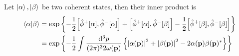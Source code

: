 \begin{lemma}\label{thm:coherent_state_inner_product}
	Let $\ket{\alpha},\ket{\beta}$ be two coherent states, then their inner product is
	\begin{equation}
		\begin{split}
			\braket{\alpha}{\beta}
			&=
			\exp\left\{
				-
				\frac{1}{2}
				\comm{\hat\phi^+[\alpha]}{\hat\phi^-[\alpha]}
				+
				\comm{\hat\phi^+[\alpha]}{\hat\phi^-[\beta]}
				-
				\frac{1}{2}
				\comm{\hat\phi^+[\beta]}{\hat\phi^-[\beta]}
			\right\}
			\\
			&=
			\exp\left\{
				-
				\frac{1}{2}
				\int\frac{\dd[3]{p}}{(2\pi)^32\omega(\vb{p})}
				\left\{
					\abs{\alpha(\vb{p})}^2
					+
					\abs{\beta(\vb{p})}^2
					-
					2\alpha(\vb{p})\beta(\vb{p})^*
				\right\}
			\right\}
		\end{split}
	\end{equation}
\end{lemma}